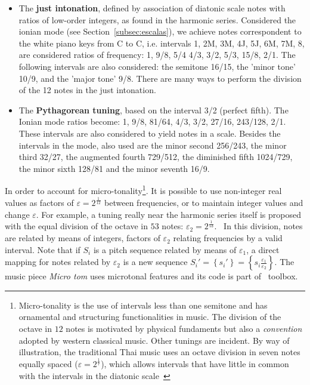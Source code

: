 \begin{itemize}
    \item The {\bf just intonation}, defined by association of diatonic scale notes with ratios of low-order integers, as found in the harmonic series. Considered the ionian mode (see Section~\ref{subsec:escalas}), we achieve notes correspondent to the white piano keys from C to C, i.e. intervals 1, 2M, 3M, 4J, 5J, 6M, 7M, 8, are considered ratios of frequency: 1, 9/8, 5/4
    4/3, 3/2, 5/3, 15/8, 2/1. The following intervals are also considered: the semitone 16/15, the 'minor tone' 10/9, and the 'major tone' 9/8. There are many ways to perform the division of the 12 notes in the just intonation.

    \item The {\bf Pythagorean tuning}, based on the interval 3/2 (perfect fifth). The Ionian mode ratios become: 1, 9/8, 81/64, 4/3, 3/2, 27/16, 243/128, 2/1. These intervals are also considered to yield notes in a scale. Besides the intervals in the mode, also used are the minor second 256/243, the minor third 32/27, the augmented fourth 729/512, the diminished fifth 1024/729, the minor sixth 128/81 and the minor seventh 16/9. 
\end{itemize}

In order to account for micro-tonality\footnote{Micro-tonality is the use of intervals less
than one semitone and has ornamental and structuring functionalities in music. The division of the octave in $12$ notes is motivated by physical fundaments but also a \emph{convention} adopted by western classical music. Other tunings are incident. By way of illustration, the traditional Thai music uses an octave division in seven notes equally spaced ($\varepsilon=2^{\frac{1}{7}}$),
which allows intervals that have little in common with the intervals in the diatonic scale~\cite{Wisnick}}. It is possible to use non-integer real values as factors of $\varepsilon=2^{\frac{1}{12}}$ between frequencies, or to maintain integer values and change $\varepsilon$. For example, a tuning really near the harmonic series
itself is proposed with the equal division of the octave in $53$ notes:
$\varepsilon_2=2^{\frac{1}{53}}$.~\cite{microtonalidade}
In this division, notes are related by means of integers, factors of
$\varepsilon_2$ relating frequencies by a valid interval. Note that if $S_i$ is a pitch sequence related by means of $\varepsilon_1$, a direct mapping for notes related by $\varepsilon_2$ is 
a new sequence $S_i'=\left\{s_i'\right\}=\left\{
s_i \frac{\varepsilon_1}{\varepsilon_2}\right\}$. The music piece \emph{Micro
tom} uses microtonal features and its code
is part of \massa\ toolbox.

